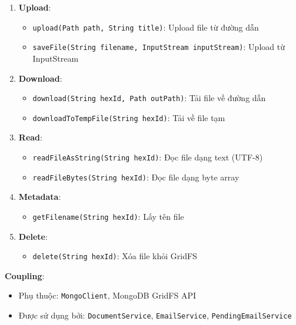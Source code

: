 \documentclass[12pt,a4paper]{article}
\begin{document}
\begin{enumerate}
    \item \textbf{Upload}:
    \begin{itemize}
        \item \texttt{upload(Path path, String title)}: Upload file từ đường dẫn
        \item \texttt{saveFile(String filename, InputStream inputStream)}: Upload từ InputStream
    \end{itemize}
    
    \item \textbf{Download}:
    \begin{itemize}
        \item \texttt{download(String hexId, Path outPath)}: Tải file về đường dẫn
        \item \texttt{downloadToTempFile(String hexId)}: Tải về file tạm
    \end{itemize}
    
    \item \textbf{Read}:
    \begin{itemize}
        \item \texttt{readFileAsString(String hexId)}: Đọc file dạng text (UTF-8)
        \item \texttt{readFileBytes(String hexId)}: Đọc file dạng byte array
    \end{itemize}
    
    \item \textbf{Metadata}:
    \begin{itemize}
        \item \texttt{getFilename(String hexId)}: Lấy tên file
    \end{itemize}
    
    \item \textbf{Delete}:
    \begin{itemize}
        \item \texttt{delete(String hexId)}: Xóa file khỏi GridFS
    \end{itemize}
\end{enumerate}

\textbf{Coupling}:
\begin{itemize}
    \item Phụ thuộc: \texttt{MongoClient}, MongoDB GridFS API
    \item Được sử dụng bởi: \texttt{DocumentService}, \texttt{EmailService}, \texttt{PendingEmailService}
\end{itemize}
\end{document}
